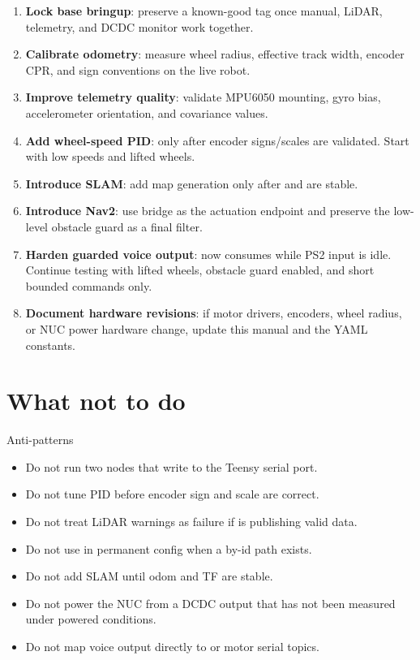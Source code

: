 \begin{enumerate}
  \item \textbf{Lock base bringup}: preserve a known-good tag once manual, LiDAR, telemetry, and DCDC monitor work together.
  \item \textbf{Calibrate odometry}: measure wheel radius, effective track width, encoder CPR, and sign conventions on the live robot.
  \item \textbf{Improve telemetry quality}: validate MPU6050 mounting, gyro bias, accelerometer orientation, and covariance values.
  \item \textbf{Add wheel-speed PID}: only after encoder signs/scales are validated. Start with low speeds and lifted wheels.
  \item \textbf{Introduce SLAM}: add map generation only after  and  are stable.
  \item \textbf{Introduce Nav2}: use  bridge as the actuation endpoint and preserve the low-level obstacle guard as a final filter.
  \item \textbf{Harden guarded voice output}:  now consumes  while PS2 input is idle. Continue testing with lifted wheels, obstacle guard enabled, and short bounded commands only.
  \item \textbf{Document hardware revisions}: if motor drivers, encoders, wheel radius, or NUC power hardware change, update this manual and the YAML constants.
\end{enumerate}

\section{What not to do}

\begin{safetybox}{Anti-patterns}
\begin{itemize}
  \item Do not run two nodes that write to the Teensy serial port.
  \item Do not tune PID before encoder sign and scale are correct.
  \item Do not treat LiDAR warnings as failure if  is publishing valid data.
  \item Do not use  in permanent config when a by-id path exists.
  \item Do not add SLAM until odom and TF are stable.
  \item Do not power the NUC from a DCDC output that has not been measured under powered conditions.
  \item Do not map voice output directly to  or motor serial topics.
\end{itemize}
\end{safetybox}

